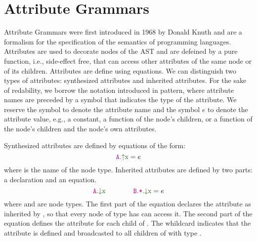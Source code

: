\chapter{Attribute Grammars}
Attribute Grammars were first introduced in 1968 by Donald Knuth and are a formalism for the specification
of the semantics of programming languages. Attributes are used to decorate nodes of the AST
and are defeined by a pure function, i.e., side-effect free, that can access other attributes of the same node or of its children.
Attributes are define using equations. We can distinguish two types of attributes: synthesized attributes and inherited attributes.
For the sake of redability, we borrow the notation introduced in pattern, 
where attribute names are preceded by a symbol that indicates the type of the attribute.
We reserve the symbol  to denote the attribute name and the symbol $e$ to denote the attribute value,
e.g., a constant, a function of the node's children, or a function of the node's children 
and the node's own attributes. 

Synthesized attributes are defined by equations of the form:
\begin{equation*}
\Asyn{A}{x} = e
\end{equation*}
where  is the name of the node type.
Inherited attributes are defined by two parts: a declaration and an equation.
\begin{equation*}
\Ainh{A}{x} \quad\quad \quad\quad \Ainhdef{B}{*}{x} = e
\end{equation*}
where  and  are node types. 
The first part of the equation declares the attribute  as inherited by ,
so that every node of type  has can access it. The second part of the 
equation defines the attribute for each child of . The whildcard \astnode{*}
indicates that the attribute is defined and broadcasted to all children of  with type .

